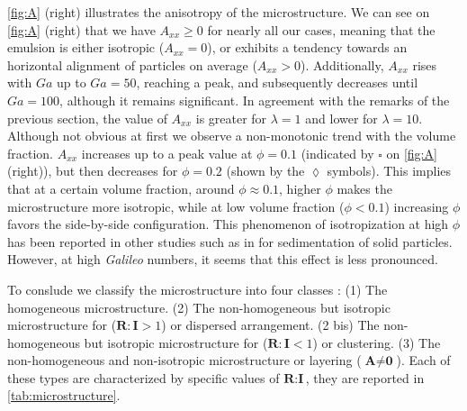  
\ref{fig:A} (right) illustrates the anisotropy of the microstructure. We can see on \ref{fig:A} (right) that we have $A_{xx} \ge 0$ for nearly all our cases, meaning that the emulsion is either isotropic ($A_{xx} = 0$), or exhibits a tendency towards an horizontal alignment of particles on average ($A_{xx} >0$). %
Additionally, $A_{xx}$ rises with $Ga$ up to $Ga = 50$, reaching a peak, and subsequently decreases until $Ga = 100$, although it remains significant.
In agreement with the remarks of the previous section, the value of $A_{xx}$ is greater for $\lambda = 1$ and lower for  $\lambda = 10$.
Although not obvious at first we observe a non-monotonic trend with the volume fraction. $A_{xx}$ increases up to a peak value at $\phi = 0.1$ (indicated by \textcolor{col3}{$\pmb\square$} on \ref{fig:A} (right)), but then decreases for $\phi=0.2$ (shown by the \textcolor{col4}{$\pmb\lozenge$} symbols). %
This implies that at a certain volume fraction, around $\phi \approx 0.1$, higher $\phi$ makes the microstructure more isotropic, while at low volume fraction ($\phi < 0.1$) increasing $\phi$ favors the side-by-side configuration.
This phenomenon of isotropization at high $\phi$ has been reported in other studies such as in \citet{seyed2021sedimentation} for sedimentation of solid particles. 
However, at high \textit{Galileo} numbers, it seems that this effect is less pronounced. 


To conslude we classify the microstructure into four classes :
(1) The homogeneous microstructure.
(2) The non-homogeneous but isotropic microstructure for ($\textbf{R}:\textbf{I} > 1$) or dispersed arrangement. %
(2 bis) The non-homogeneous but isotropic microstructure for ($\textbf{R}:\textbf{I} < 1$) or clustering. 
(3) The non-homogeneous and non-isotropic microstructure or layering ($\textbf{A}\neq \textbf{0}$). 
Each of these types are characterized by specific values of $\textbf{R}:\textbf{I}$, they are reported in \ref{tab:microstructure}. 

